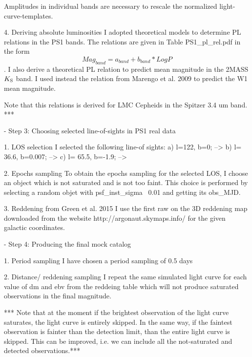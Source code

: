             Amplitudes in individual bands are necessary to rescale the normalized light-curve-templates.


        4. Deriving absolute luminosities 
            I adopted theoretical models to determine PL relations in the PS1 bands.
            The relations are given in Table PS1_pl_rel.pdf in the form 
            $$Mag_{band}= a_{band} + b_{band} * Log P $$.
            I also derive a theoretical PL relation to predict mean magnitude in the 2MASS $K_{\rm{S}}$ band.
            I used instead the relation from Marengo et al. 2009 to predict the W1 mean magnitude.
     
            Note that this relations is derived for LMC Cepheids in the Spitzer 3.4 um band. ***


- Step 3: Choosing selected line-of-sights in PS1 real data
        
        1. LOS selection
                I selected the following line-of sights:
                 a) l=122, b=0;   -->
                 b) l= 36.6, b=0.007; -->
                 c) l= 65.5, b=-1.9; -->

             
        2. Epochs sampling
                To obtain the epochs sampling for the selected LOS, I choose an object which is not saturated and is not too faint.
                This choice is performed by selecting a random objet with psf_inst_sigma ~0.01
                and getting its obs_MJD.
            
        3. Reddening from Green et al. 2015
                I use the first raw on the 3D reddening map downloaded from the website http://argonaut.skymaps.info/ 
                for the given galactic coordinates.
    
        
- Step 4: Producing the final mock catalog
        
        1. Period sampling
            I have chosen a period sampling of 0.5 days
        
        2. Distance/ reddening sampling
                I  repeat the same simulated light curve for each value of  dm and ebv  from the reddeing table
                which will not produce saturated observations in the final magnitude.
        
        *** Note that at the moment if the brightest observation of the light curve saturates, the light curve is entirely skipped. 
        In the same way, if the faintest observation is fainter than the detection limit, than the entire light curve is skipped.
        This can be improved, i.e. we can include all the not-saturated and detected observations.***
        
